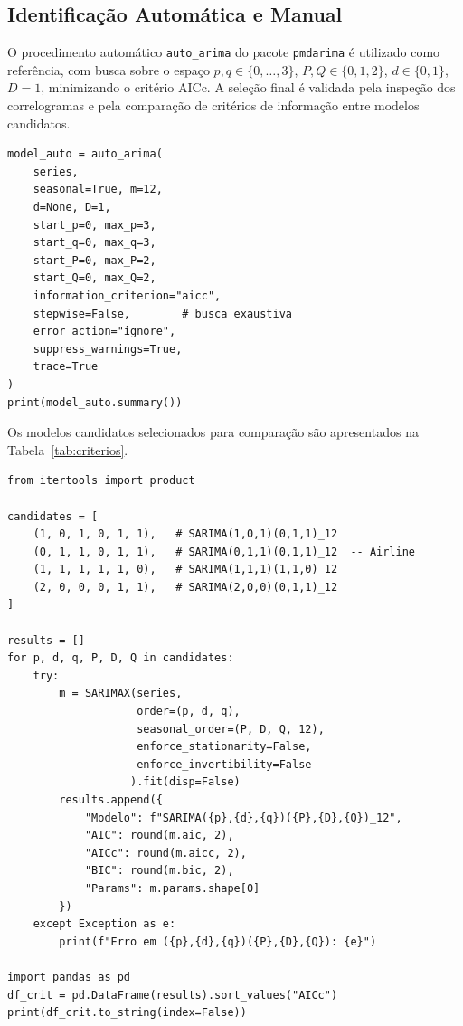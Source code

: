 \documentclass[12pt, a4paper]{article}
\begin{document}
\subsection{Identificação Automática e Manual}

O procedimento automático \texttt{auto\_arima} do pacote \texttt{pmdarima} é utilizado
como referência, com busca sobre o espaço
$p, q \in \{0,\ldots,3\}$, $P, Q \in \{0,1,2\}$, $d \in \{0,1\}$, $D = 1$,
minimizando o critério AICc. A seleção final é validada pela inspeção dos correlogramas
e pela comparação de critérios de informação entre modelos candidatos.

\begin{lstlisting}[caption={Identificação automática com \texttt{auto\_arima}.},
                   label={lst:autoarima}]
model_auto = auto_arima(
    series,
    seasonal=True, m=12,
    d=None, D=1,
    start_p=0, max_p=3,
    start_q=0, max_q=3,
    start_P=0, max_P=2,
    start_Q=0, max_Q=2,
    information_criterion="aicc",
    stepwise=False,        # busca exaustiva
    error_action="ignore",
    suppress_warnings=True,
    trace=True
)
print(model_auto.summary())
\end{lstlisting}

Os modelos candidatos selecionados para comparação são apresentados na
Tabela~\ref{tab:criterios}.

\begin{lstlisting}[caption={Estimação e comparação de modelos candidatos.},
                   label={lst:candidatos}]
from itertools import product

candidates = [
    (1, 0, 1, 0, 1, 1),   # SARIMA(1,0,1)(0,1,1)_12
    (0, 1, 1, 0, 1, 1),   # SARIMA(0,1,1)(0,1,1)_12  -- Airline
    (1, 1, 1, 1, 1, 0),   # SARIMA(1,1,1)(1,1,0)_12
    (2, 0, 0, 0, 1, 1),   # SARIMA(2,0,0)(0,1,1)_12
]

results = []
for p, d, q, P, D, Q in candidates:
    try:
        m = SARIMAX(series,
                    order=(p, d, q),
                    seasonal_order=(P, D, Q, 12),
                    enforce_stationarity=False,
                    enforce_invertibility=False
                   ).fit(disp=False)
        results.append({
            "Modelo": f"SARIMA({p},{d},{q})({P},{D},{Q})_12",
            "AIC": round(m.aic, 2),
            "AICc": round(m.aicc, 2),
            "BIC": round(m.bic, 2),
            "Params": m.params.shape[0]
        })
    except Exception as e:
        print(f"Erro em ({p},{d},{q})({P},{D},{Q}): {e}")

import pandas as pd
df_crit = pd.DataFrame(results).sort_values("AICc")
print(df_crit.to_string(index=False))
\end{lstlisting}
\end{document}
